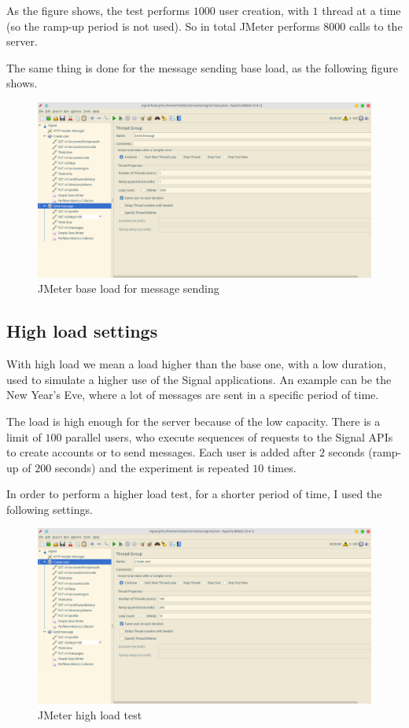 As the figure shows, the test performs $1000$ user creation, with $1$ thread at a time (so the ramp-up period is not used). So in total JMeter performs $8000$ calls to the server.

The same thing is done for the message sending base load, as the following figure shows.

\begin{figure}[H]
    \centering
    \includegraphics[width=\textwidth]{images/signal-message-base}
    \caption{JMeter base load for message sending}
    \label{fig:jmeterbasemessage}
\end{figure}

\subsection{High load settings\label{sec:highloadsettings}}

With high load we mean a load higher than the base one, with a low duration, used to simulate a higher use of the Signal applications. An example can be the New Year's Eve, where a lot of messages are sent in a specific period of time.



The load is high enough for the server because of the low capacity.
There is a limit of $100$ parallel users, who execute sequences of requests to the Signal APIs to create accounts or to send messages. Each user is added after $2$ seconds (ramp-up of $200$ seconds) and the experiment is repeated $10$ times.

In order to perform a higher load test, for a shorter period of time, I used the following settings.

\begin{figure}[H]
    \centering
    \includegraphics[width=\textwidth]{images/signal-load}
    \caption{JMeter high load test}
    \label{fig:jmeterhighload}
\end{figure}

